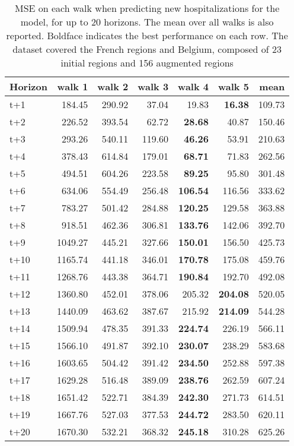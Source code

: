 \begin{table}[H]
\centering
\caption{MSE on each walk when predicting new hospitalizations for the model, for up to 20 horizons. The mean over all walks is also reported. Boldface indicates the best performance on each row. The dataset covered the French regions and Belgium, composed of 23 initial regions and 156 augmented regions }
\label{tab:MSE_walk_encoder_decoder}
\begin{tabular}{lrrrrrr}
\toprule
Horizon &  walk 1 &  walk 2 &  walk 3 &  walk 4 &  walk 5 &   mean \\
\midrule
t+1  & 184.45  & 290.92  & 37.04  & 19.83  & \textbf{16.38}  & 109.73  \\
t+2  & 226.52  & 393.54  & 62.72  & \textbf{28.68}  & 40.87  & 150.46  \\
t+3  & 293.26  & 540.11  & 119.60  & \textbf{46.26}  & 53.91  & 210.63  \\
t+4  & 378.43  & 614.84  & 179.01  & \textbf{68.71}  & 71.83  & 262.56  \\
t+5  & 494.51  & 604.26  & 223.58  & \textbf{89.25}  & 95.80  & 301.48  \\
t+6  & 634.06  & 554.49  & 256.48  & \textbf{106.54}  & 116.56  & 333.62  \\
t+7  & 783.27  & 501.42  & 284.88  & \textbf{120.25}  & 129.58  & 363.88  \\
t+8  & 918.51  & 462.36  & 306.81  & \textbf{133.76}  & 142.06  & 392.70  \\
t+9  & 1049.27  & 445.21  & 327.66  & \textbf{150.01}  & 156.50  & 425.73  \\
t+10  & 1165.74  & 441.18  & 346.01  & \textbf{170.78}  & 175.08  & 459.76  \\
t+11  & 1268.76  & 443.38  & 364.71  & \textbf{190.84}  & 192.70  & 492.08  \\
t+12  & 1360.80  & 452.01  & 378.06  & 205.32  & \textbf{204.08}  & 520.05  \\
t+13  & 1440.09  & 463.62  & 387.67  & 215.92  & \textbf{214.09}  & 544.28  \\
t+14  & 1509.94  & 478.35  & 391.33  & \textbf{224.74}  & 226.19  & 566.11  \\
t+15  & 1566.10  & 491.87  & 392.10  & \textbf{230.07}  & 238.29  & 583.68  \\
t+16  & 1603.65  & 504.42  & 391.42  & \textbf{234.50}  & 252.88  & 597.38  \\
t+17  & 1629.28  & 516.48  & 389.09  & \textbf{238.76}  & 262.59  & 607.24  \\
t+18  & 1651.42  & 522.71  & 384.39  & \textbf{242.30}  & 271.73  & 614.51  \\
t+19  & 1667.76  & 527.03  & 377.53  & \textbf{244.72}  & 283.50  & 620.11  \\
t+20  & 1670.30  & 532.21  & 368.32  & \textbf{245.18}  & 310.28  & 625.26  \\

\bottomrule
\end{tabular}
\end{table}
